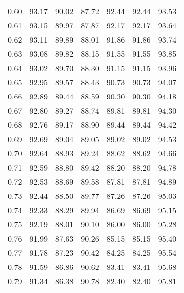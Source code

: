\begin{tabular}{|c|c|c|c|c|c|c|}
      0.60 &     93.17 &     90.02 &      87.72 &   92.44 &      92.44 &         93.53 \\
      0.61 &     93.15 &     89.97 &      87.87 &   92.17 &      92.17 &         93.64 \\
      0.62 &     93.11 &     89.89 &      88.01 &   91.86 &      91.86 &         93.74 \\
      0.63 &     93.08 &     89.82 &      88.15 &   91.55 &      91.55 &         93.85 \\
      0.64 &     93.02 &     89.70 &      88.30 &   91.15 &      91.15 &         93.96 \\
      0.65 &     92.95 &     89.57 &      88.43 &   90.73 &      90.73 &         94.07 \\
      0.66 &     92.89 &     89.44 &      88.59 &   90.30 &      90.30 &         94.18 \\
      0.67 &     92.80 &     89.27 &      88.74 &   89.81 &      89.81 &         94.30 \\
      0.68 &     92.76 &     89.17 &      88.90 &   89.44 &      89.44 &         94.42 \\
      0.69 &     92.69 &     89.04 &      89.05 &   89.02 &      89.02 &         94.53 \\
      0.70 &     92.64 &     88.93 &      89.24 &   88.62 &      88.62 &         94.66 \\
      0.71 &     92.59 &     88.80 &      89.42 &   88.20 &      88.20 &         94.78 \\
      0.72 &     92.53 &     88.69 &      89.58 &   87.81 &      87.81 &         94.89 \\
      0.73 &     92.44 &     88.50 &      89.77 &   87.26 &      87.26 &         95.03 \\
      0.74 &     92.33 &     88.29 &      89.94 &   86.69 &      86.69 &         95.15 \\
      0.75 &     92.19 &     88.01 &      90.10 &   86.00 &      86.00 &         95.28 \\
      0.76 &     91.99 &     87.63 &      90.26 &   85.15 &      85.15 &         95.40 \\
      0.77 &     91.78 &     87.23 &      90.42 &   84.25 &      84.25 &         95.54 \\
      0.78 &     91.59 &     86.86 &      90.62 &   83.41 &      83.41 &         95.68 \\
      0.79 &     91.34 &     86.38 &      90.78 &   82.40 &      82.40 &         95.81 \\

\end{tabular}
